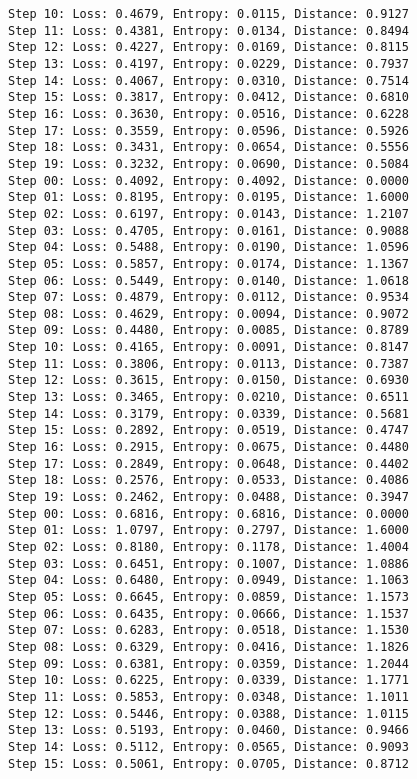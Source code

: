 \documentclass[11pt]{article}
\begin{document}
\begin{Verbatim}[commandchars=\\\{\}]
Step 10: Loss: 0.4679, Entropy: 0.0115, Distance: 0.9127
Step 11: Loss: 0.4381, Entropy: 0.0134, Distance: 0.8494
Step 12: Loss: 0.4227, Entropy: 0.0169, Distance: 0.8115
Step 13: Loss: 0.4197, Entropy: 0.0229, Distance: 0.7937
Step 14: Loss: 0.4067, Entropy: 0.0310, Distance: 0.7514
Step 15: Loss: 0.3817, Entropy: 0.0412, Distance: 0.6810
Step 16: Loss: 0.3630, Entropy: 0.0516, Distance: 0.6228
Step 17: Loss: 0.3559, Entropy: 0.0596, Distance: 0.5926
Step 18: Loss: 0.3431, Entropy: 0.0654, Distance: 0.5556
Step 19: Loss: 0.3232, Entropy: 0.0690, Distance: 0.5084
Step 00: Loss: 0.4092, Entropy: 0.4092, Distance: 0.0000
Step 01: Loss: 0.8195, Entropy: 0.0195, Distance: 1.6000
Step 02: Loss: 0.6197, Entropy: 0.0143, Distance: 1.2107
Step 03: Loss: 0.4705, Entropy: 0.0161, Distance: 0.9088
Step 04: Loss: 0.5488, Entropy: 0.0190, Distance: 1.0596
Step 05: Loss: 0.5857, Entropy: 0.0174, Distance: 1.1367
Step 06: Loss: 0.5449, Entropy: 0.0140, Distance: 1.0618
Step 07: Loss: 0.4879, Entropy: 0.0112, Distance: 0.9534
Step 08: Loss: 0.4629, Entropy: 0.0094, Distance: 0.9072
Step 09: Loss: 0.4480, Entropy: 0.0085, Distance: 0.8789
Step 10: Loss: 0.4165, Entropy: 0.0091, Distance: 0.8147
Step 11: Loss: 0.3806, Entropy: 0.0113, Distance: 0.7387
Step 12: Loss: 0.3615, Entropy: 0.0150, Distance: 0.6930
Step 13: Loss: 0.3465, Entropy: 0.0210, Distance: 0.6511
Step 14: Loss: 0.3179, Entropy: 0.0339, Distance: 0.5681
Step 15: Loss: 0.2892, Entropy: 0.0519, Distance: 0.4747
Step 16: Loss: 0.2915, Entropy: 0.0675, Distance: 0.4480
Step 17: Loss: 0.2849, Entropy: 0.0648, Distance: 0.4402
Step 18: Loss: 0.2576, Entropy: 0.0533, Distance: 0.4086
Step 19: Loss: 0.2462, Entropy: 0.0488, Distance: 0.3947
Step 00: Loss: 0.6816, Entropy: 0.6816, Distance: 0.0000
Step 01: Loss: 1.0797, Entropy: 0.2797, Distance: 1.6000
Step 02: Loss: 0.8180, Entropy: 0.1178, Distance: 1.4004
Step 03: Loss: 0.6451, Entropy: 0.1007, Distance: 1.0886
Step 04: Loss: 0.6480, Entropy: 0.0949, Distance: 1.1063
Step 05: Loss: 0.6645, Entropy: 0.0859, Distance: 1.1573
Step 06: Loss: 0.6435, Entropy: 0.0666, Distance: 1.1537
Step 07: Loss: 0.6283, Entropy: 0.0518, Distance: 1.1530
Step 08: Loss: 0.6329, Entropy: 0.0416, Distance: 1.1826
Step 09: Loss: 0.6381, Entropy: 0.0359, Distance: 1.2044
Step 10: Loss: 0.6225, Entropy: 0.0339, Distance: 1.1771
Step 11: Loss: 0.5853, Entropy: 0.0348, Distance: 1.1011
Step 12: Loss: 0.5446, Entropy: 0.0388, Distance: 1.0115
Step 13: Loss: 0.5193, Entropy: 0.0460, Distance: 0.9466
Step 14: Loss: 0.5112, Entropy: 0.0565, Distance: 0.9093
Step 15: Loss: 0.5061, Entropy: 0.0705, Distance: 0.8712

\end{Verbatim}
\end{document}
